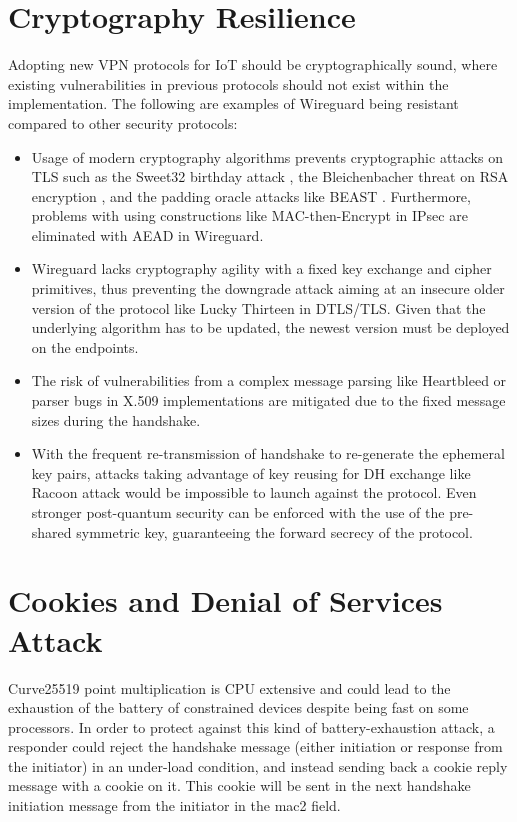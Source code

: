 \section{Cryptography Resilience} \label{iot:crypt}
  Adopting new VPN protocols for IoT should be cryptographically sound, where existing
  vulnerabilities in previous protocols should not exist within the implementation. The following
  are examples of Wireguard being resistant compared to other security protocols:
  \begin{itemize}
    \item Usage of modern cryptography algorithms prevents cryptographic attacks on TLS
    such as the Sweet32 birthday attack \cite{sweet32}, the Bleichenbacher threat on RSA encryption \cite{bleichen}, 
    and the padding oracle attacks like BEAST \cite{beast}.  Furthermore, problems with using
    constructions like MAC-then-Encrypt in IPsec \cite{ipsec_conf} are eliminated with AEAD in Wireguard.
    \item Wireguard lacks cryptography agility \cite{boring} with a fixed key exchange and cipher 
    primitives, thus preventing the  downgrade attack aiming at an insecure older version of the 
    protocol like Lucky Thirteen \cite{lucky} in DTLS/TLS. Given that the underlying algorithm has 
    to be updated, the newest version must be deployed on the endpoints.
    \item The risk of vulnerabilities from a complex message parsing like Heartbleed \cite{heartbleed} 
    or parser bugs in X.509 implementations \cite{x509} are mitigated due to the fixed message sizes 
    during the handshake.
    \item With the frequent re-transmission of handshake to re-generate the ephemeral key pairs, 
    attacks taking advantage of key reusing for DH exchange like Racoon attack \cite{raccoon} would be impossible 
    to launch against the protocol. Even stronger post-quantum security can be enforced with the 
    use of the pre-shared symmetric key, guaranteeing the forward secrecy of the protocol.
  \end{itemize}
\section{Cookies and Denial of Services Attack} \label{iot:cookie}
  Curve25519 point multiplication is  CPU extensive \cite{wireguard} and could lead to
  the exhaustion of the battery of constrained devices despite being fast on some processors. In order to
  protect against this kind of battery-exhaustion attack, a responder could reject the handshake message (either
  initiation or response from the initiator) in an under-load condition, and instead sending back
  a cookie reply message with a cookie on it. This cookie will be sent in the next handshake initiation
  message from the initiator in the mac2 field.
  
